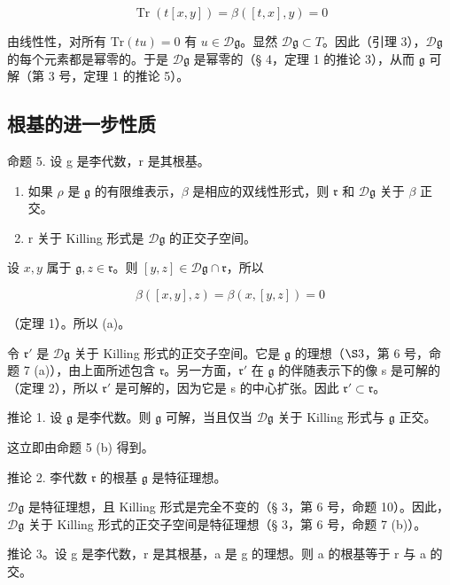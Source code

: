 \[
\operatorname{Tr} (t [ x, y ]) = \beta ([ t, x ], y) = 0
\]

由线性性，对所有 \(\mathrm{Tr}(tu) = 0\) 有 \(u\in \mathcal{D}\mathfrak{g}\)。显然 \(\mathcal{D}\mathfrak{g}\subset T\)。因此（引理 3），\(\mathcal{D}\mathfrak{g}\) 的每个元素都是幂零的。于是 \(\mathcal{D}\mathfrak{g}\) 是幂零的（§ 4，定理 1 的推论 3），从而 \(\mathfrak{g}\) 可解（第 3 号，定理 1 的推论 5）。

\subsection{根基的进一步性质}

命题 5. 设 g 是李代数，r 是其根基。

\begin{enumerate}
\def\labelenumi{(\alph{enumi})}
\item
  如果 \(\rho\) 是 \(\mathfrak{g}\) 的有限维表示，\(\beta\) 是相应的双线性形式，则 \(\mathfrak{r}\) 和 \(\mathcal{D}\mathfrak{g}\) 关于 \(\beta\) 正交。
\item
  r 关于 Killing 形式是 \(\mathcal{D}\mathfrak{g}\) 的正交子空间。
\end{enumerate}

设 \(x, y\) 属于 \(\mathfrak{g}, z \in \mathfrak{r}\)。则 \([y, z] \in \mathcal{D}\mathfrak{g} \cap \mathfrak{r}\)，所以

\[
\beta ([ x, y ], z) = \beta (x, [ y, z ]) = 0
\]

（定理 1）。所以 (a)。

令 \(\mathfrak{r}'\) 是 \(\mathcal{D}\mathfrak{g}\) 关于 Killing 形式的正交子空间。它是 \(\mathfrak{g}\) 的理想（\(\S 3\)，第 6 号，命题 7 (a)），由上面所述包含 \(\mathfrak{r}\)。另一方面，\(\mathfrak{r}'\) 在 \(\mathfrak{g}\) 的伴随表示下的像 s 是可解的（定理 2），所以 \(\mathfrak{r}'\) 是可解的，因为它是 s 的中心扩张。因此 \(\mathfrak{r}' \subset \mathfrak{r}\)。

推论 1. 设 \(\mathfrak{g}\) 是李代数。则 \(\mathfrak{g}\) 可解，当且仅当 \(\mathcal{D}\mathfrak{g}\) 关于 Killing 形式与 \(\mathfrak{g}\) 正交。

这立即由命题 5 (b) 得到。

推论 2. 李代数 \(\mathfrak{r}\) 的根基 \(\mathfrak{g}\) 是特征理想。

\(\mathcal{D}\mathfrak{g}\) 是特征理想，且 Killing 形式是完全不变的（§ 3，第 6 号，命题 10）。因此，\(\mathcal{D}\mathfrak{g}\) 关于 Killing 形式的正交子空间是特征理想（§ 3，第 6 号，命题 7 (b)）。

推论 3。设 g 是李代数，r 是其根基，a 是 g 的理想。则 a 的根基等于 r 与 a 的交。

